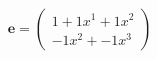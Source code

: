 \documentclass[preview]{standalone}
\begin{document}
\begin{align*}
\mathbf{e} = \begin{pmatrix}1 + 1x^{1} + 1x^{2} \\ -1x^{2} + -1x^{3}\end{pmatrix}
\end{align*}
\end{document}
